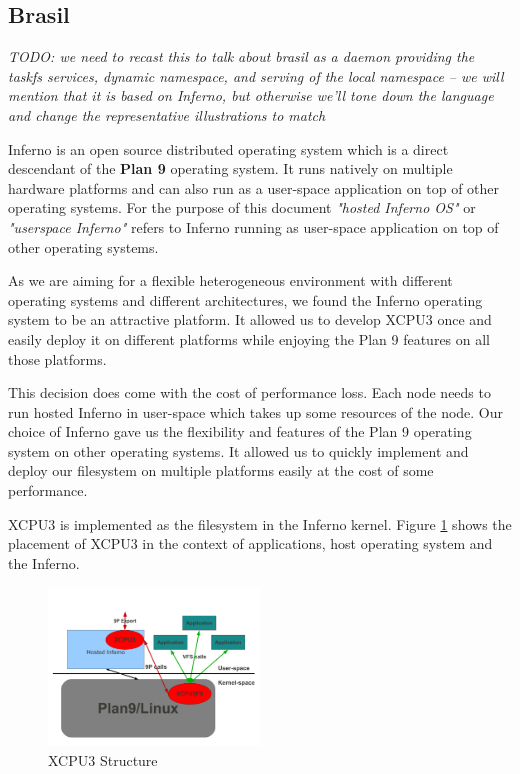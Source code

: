 \subsection{Brasil}
\emph{TODO: we need to recast this to talk about brasil as a daemon providing
the taskfs services, dynamic namespace, and serving of the local namespace --
we will mention that it is based on Inferno, but otherwise we'll tone down
the language and change the representative illustrations to match}

Inferno\cite{inferno} is an open source distributed operating system which is a 
direct descendant of the \textbf{Plan 9} operating system.  It runs natively on
multiple hardware platforms and can also run as a user-space application on
top of other operating systems.  For the purpose of this document
\textit{"hosted Inferno OS"} or \textit{"userspace Inferno"} refers to Inferno
running as user-space application on top of other operating systems.

As we are aiming for a flexible heterogeneous environment with different
operating systems and different architectures, we found the Inferno operating
system to be an attractive platform.  It allowed us to develop XCPU3 once and
easily deploy it on different platforms while enjoying the Plan 9 features
on all those platforms.

This decision does come with the cost of performance loss.  Each node needs
to run hosted Inferno in user-space which takes up some resources of the node. 
Our choice of Inferno gave us the flexibility and features of the Plan 9
operating system on other operating systems.  It allowed us to quickly
implement and deploy our filesystem on multiple platforms easily at the cost
of some performance.

XCPU3 is implemented as the filesystem in the Inferno kernel.  Figure 
\ref{fig:XCPU3} shows the placement of XCPU3 in the context of applications,
host operating system and the Inferno.

\begin{figure}[h]
  \begin{center}
    \leavevmode
      \includegraphics[height=0.2\textheight,width=0.5\textwidth]
		{./img/XCPU3Structure}
    \caption{XCPU3 Structure}
    \label{fig:XCPU3}
  \end{center}
\end{figure}


